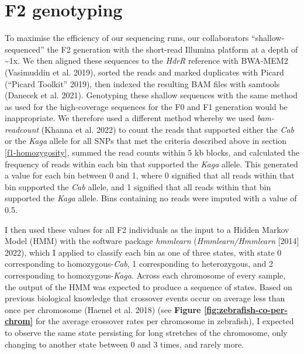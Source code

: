 \documentclass[
]{book}
\begin{document}
\hypertarget{somite-f2-sequencing}{%
\section{F2 genotyping}\label{somite-f2-sequencing}}

To maximise the efficiency of our sequencing runs, our collaborators ``shallow-sequenced'' the F2 generation with the short-read Illumina platform at a depth of \textasciitilde1x. We then aligned these sequences to the \emph{HdrR} reference with BWA-MEM2 (Vasimuddin et al. 2019), sorted the reads and marked duplicates with Picard ({``Picard Toolkit''} 2019), then indexed the resulting BAM files with samtools (Danecek et al. 2021). Genotyping these shallow sequences with the same method as used for the high-coverage sequences for the F0 and F1 generation would be inappropriate. We therefore used a different method whereby we used \emph{bam-readcount} (Khanna et al. 2022) to count the reads that supported either the \emph{Cab} or the \emph{Kaga} allele for all SNPs that met the criteria described above in section \ref{f1-homozygosity}, summed the read counts within 5 kb blocks, and calculated the frequency of reads within each bin that supported the \emph{Kaga} allele. This generated a value for each bin between 0 and 1, where 0 signified that all reads within that bin supported the \emph{Cab} allele, and 1 signified that all reads within that bin supported the \emph{Kaga} allele. Bins containing no reads were imputed with a value of 0.5.

I then used these values for all F2 individuals as the input to a Hidden Markov Model (HMM) with the software package \emph{hmmlearn} (\emph{Hmmlearn/Hmmlearn} {[}2014{]} 2022), which I applied to classify each bin as one of three states, with state 0 corresponding to homozygous-\emph{Cab}, 1 corresponding to heterozygous, and 2 corresponding to homozygous-\emph{Kaga}.
Across each chromosome of every sample, the output of the HMM was expected to produce a sequence of states. Based on previous biological knowledge that crossover events occur on average less than once per chromosome (Haenel et al. 2018) (see \textbf{Figure \ref{fig:zebrafish-co-per-chrom}} for the average crossover rates per chromosome in zebrafish), I expected to observe the same state persisting for long stretches of the chromosome, only changing to another state between 0 and 3 times, and rarely more.
\end{document}
